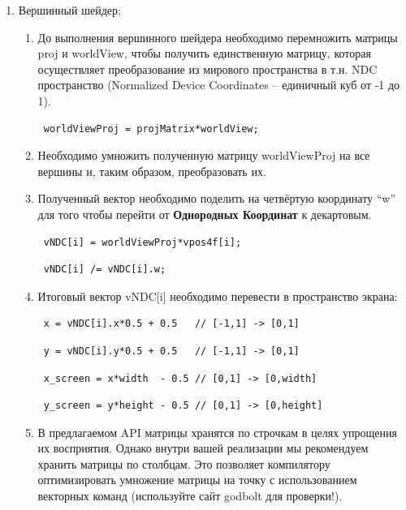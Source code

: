 \documentclass[12pt,subf,href,colorlinks=true]{article}
\begin{document}
\begin{enumerate}
\item Вершинный шейдер;
\begin{enumerate}
  \item До выполнения вершинного шейдера необходимо перемножить матрицы proj и worldView, чтобы получить единственную матрицу, которая осуществляет преобразование из мирового пространства в т.н. NDC пространство (Normalized Device Coordinates -- единичный куб от -1 до 1).
  \begin{verbatim} worldViewProj = projMatrix*worldView; \end{verbatim}
  
  \item Необходимо умножить полученную матрицу worldViewProj на все вершины и, таким образом, преобразовать их.
  
  \item Полученный вектор необходимо поделить на четвёртую координату ``w'' для того чтобы перейти от \textbf{Однородных Координат} \cite{ignatenkocoords} к декартовым. 
  
  \begin{verbatim} vNDC[i] = worldViewProj*vpos4f[i];  \end{verbatim}
  \begin{verbatim} vNDC[i] /= vNDC[i].w; \end{verbatim}
  
  \item Итоговый вектор vNDC[i] необходимо перевести в пространство экрана:
  \begin{verbatim} x = vNDC[i].x*0.5 + 0.5   // [-1,1] -> [0,1]  \end{verbatim}
  \begin{verbatim} y = vNDC[i].y*0.5 + 0.5   // [-1,1] -> [0,1]  \end{verbatim}
  \begin{verbatim} x_screen = x*width  - 0.5 // [0,1] -> [0,width] \end{verbatim}
  \begin{verbatim} y_screen = y*height - 0.5 // [0,1] -> [0,height] \end{verbatim}
  
  \item В предлагаемом API матрицы хранятся по строчкам в целях упрощения их восприятия. Однако внутри вашей реализации мы рекомендуем хранить матрицы по столбцам. Это позволяет компилятору оптимизировать умножение матрицы на точку с использованием векторных команд (используйте сайт godbolt \cite{godbolt} для проверки!).
  

\end{enumerate}
\end{enumerate}
\end{document}
